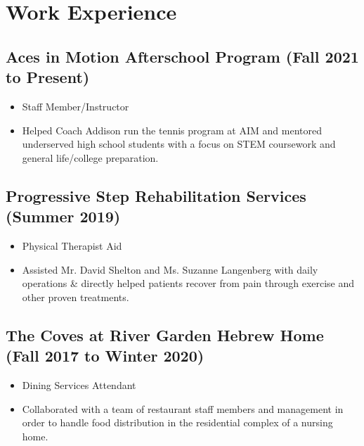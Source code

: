 \documentclass{article}
\newcommand{\sectionspacing}{\vspace{-.4em}} %
\newenvironment{CustomItemize}
{ \begin{itemize}[leftmargin=1em]
    \setlength{\itemsep}{0pt}
    \setlength{\parskip}{0pt}
    \setlength{\parindent}{0pt}
    \setlength{\parsep}{0pt}     }
{ \end{itemize}                  }
\begin{document}

\sectionspacing{}

\section{Work Experience}
\subsection{Aces in Motion Afterschool Program (Fall 2021 to Present)}
\begin{CustomItemize}
\item Staff Member/Instructor
\item Helped Coach Addison run the tennis program at AIM and mentored underserved high school students with a focus on STEM coursework and general life/college preparation.
\end{CustomItemize}

\subsection{Progressive Step Rehabilitation Services (Summer 2019)}
\begin{CustomItemize}
\item Physical Therapist Aid
\item Assisted Mr. David Shelton and Ms. Suzanne Langenberg with daily operations \& directly helped patients recover from pain through exercise and other proven treatments.
\end{CustomItemize}

\subsection{The Coves at River Garden Hebrew Home (Fall 2017 to Winter 2020)}
\begin{CustomItemize}
\item Dining Services Attendant
\item Collaborated with a team of restaurant staff members and management in order to handle food distribution in the residential complex of a nursing home.
\end{CustomItemize}
\end{document}
